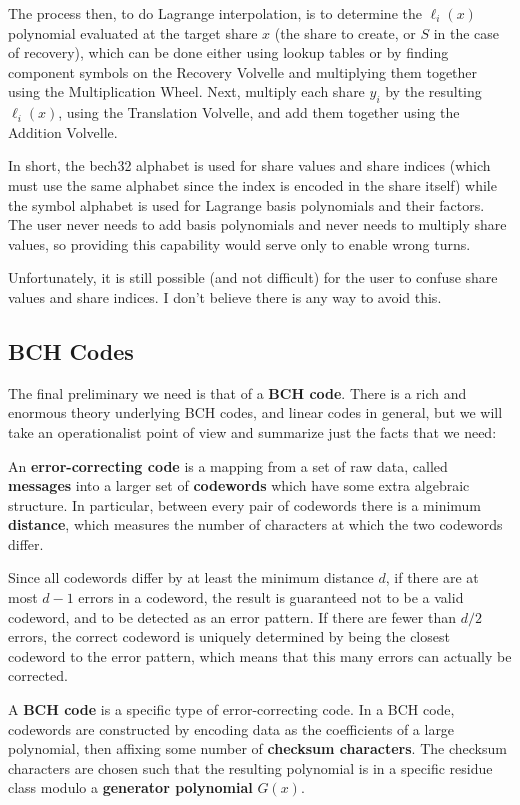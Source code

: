 \documentclass[letterpaper]{article}
\theoremstyle{xxx}
\theoremstyle{evil}
\theoremstyle{yyy}
\theoremstyle{plain}
\theoremstyle{zzz}
\begin{document}
The process then, to do Lagrange interpolation, is to determine the $\ell_i(x)$
polynomial evaluated at the target share $x$ (the share to create, or $S$ in the case
of recovery), which can be done either using lookup tables or by finding component
symbols on the Recovery Volvelle and multiplying them together using the Multiplication
Wheel. Next, multiply each share $y_i$ by the resulting $\ell_i(x)$, using the Translation
Volvelle, and add them together using the Addition Volvelle.

In short, the bech32 alphabet is used for share values and share indices (which must
use the same alphabet since the index is encoded in the share itself) while the
symbol alphabet is used for Lagrange basis polynomials and their factors. The user
never needs to add basis polynomials and never needs to multiply share values, so
providing this capability would serve only to enable wrong turns.

Unfortunately, it is still possible (and not difficult) for the user to confuse
share values and share indices. I don't believe there is any way to avoid this.

\subsection{BCH Codes}

The final preliminary we need is that of a \textbf{BCH code}. There is a
rich and enormous theory underlying BCH codes, and linear codes in general,
but we will take an operationalist point of view and summarize just the facts
that we need:

An \textbf{error-correcting code} is a mapping from a set of raw data, called
\textbf{messages} into a larger set of \textbf{codewords} which have
some extra algebraic structure. In particular, between every pair of
codewords there is a minimum \textbf{distance}, which measures the
number of characters at which the two codewords differ.

Since all codewords differ by at least the minimum distance $d$, if there
are at most $d-1$ errors in a codeword, the result is guaranteed not to
be a valid codeword, and to be detected as an error pattern. If there are fewer
than $d/2$ errors, the correct codeword is uniquely determined by being
the closest codeword to the error pattern, which means that this many
errors can actually be corrected.

A \textbf{BCH code} is a specific type of error-correcting code. In a BCH
code, codewords are constructed by encoding data as the coefficients of a
large polynomial, then affixing some number of \textbf{checksum characters}.
The checksum characters are chosen such that the resulting polynomial is in
a specific residue class modulo a \textbf{generator polynomial} $G(x)$.
\end{document}
